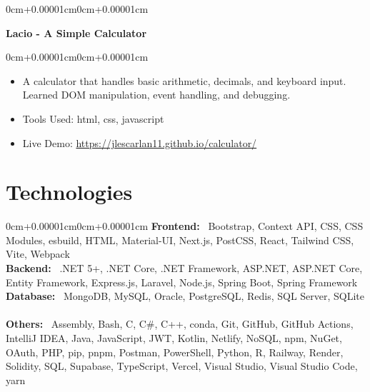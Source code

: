 \documentclass[10pt, letterpaper]{article}
\newenvironment{highlights}{\begin{itemize}[topsep=0.10cm,parsep=0.10cm,partopsep=0pt,itemsep=0pt,leftmargin=0cm+10pt]}{\end{itemize}}
\newenvironment{onecolentry}{\begin{adjustwidth}{0cm+0.00001cm}{0cm+0.00001cm}}{\end{adjustwidth}}
\newenvironment{twocolentry}[2][]{\onecolentry\def\secondColumn{#2}\setcolumnwidth{\fill,8cm}\begin{paracol}{2}}{\switchcolumn \raggedleft \secondColumn\end{paracol}\endonecolentry}
\begin{document}
    \begin{twocolentry}{2025}
      \textbf{Lacio - A Simple Calculator}\end{twocolentry}
    \vspace{0.10cm}
    \begin{onecolentry}
      \begin{highlights}
        \item A calculator that handles basic arithmetic, decimals, and keyboard input. Learned DOM manipulation, event handling, and debugging.
        \item Tools Used: html, css, javascript
        \item Live Demo: \href{https://jlescarlan11.github.io/calculator/}{https://jlescarlan11.github.io/calculator/}
      \end{highlights}
    \end{onecolentry}
    \vspace{0.15cm}
  
\section{Technologies}
\begin{onecolentry}
    \textbf{Frontend:} \
    Bootstrap, Context API, CSS, CSS Modules, esbuild, HTML, Material-UI, Next.js, PostCSS, React, Tailwind CSS, Vite, Webpack \
    \vspace{0.10cm}
    \\ \textbf{Backend:} \
    .NET 5+, .NET Core, .NET Framework, ASP.NET, ASP.NET Core, Entity Framework, Express.js, Laravel, Node.js, Spring Boot, Spring Framework \
    \vspace{0.10cm}
    \\ \textbf{Database:} \
    MongoDB, MySQL, Oracle, PostgreSQL, Redis, SQL Server, SQLite \
    \vspace{0.10cm}
    \\ \textbf{Others:} \
    Assembly, Bash, C, C\#, C++, conda, Git, GitHub, GitHub Actions, IntelliJ IDEA, Java, JavaScript, JWT, Kotlin, Netlify, NoSQL, npm, NuGet, OAuth, PHP, pip, pnpm, Postman, PowerShell, Python, R, Railway, Render, Solidity, SQL, Supabase, TypeScript, Vercel, Visual Studio, Visual Studio Code, yarn \
    \vspace{0.10cm}

\end{onecolentry}
\end{document}

